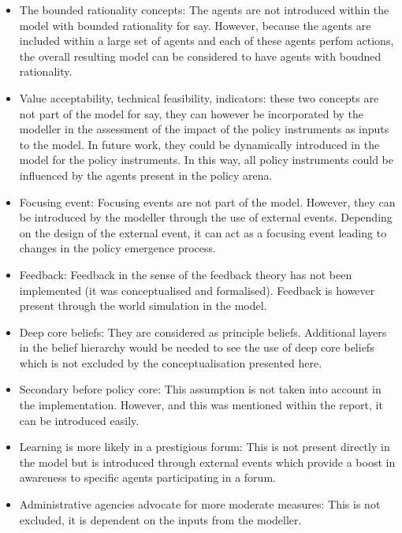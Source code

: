 \begin{itemize}
\item The bounded rationality concepts: The agents are not introduced within the model with bounded rationality for say. However, because the agents are included within a large set of agents and each of these agents perfom actions, the overall resulting model can be considered to have agents with boudned rationality. 
\item Value acceptability, technical feasibility, indicators: these two concepts are not part of the model for say, they can however be incorporated by the modeller in the assessment of the impact of the policy instruments as inputs to the model. In future work, they could be dynamically introduced in the model for the policy instruments. In this way, all policy instruments could be influenced by the agents present in the policy arena.
\item Focusing event: Focusing events are not part of the model. However, they can be introduced by the modeller through the use of external events. Depending on the design of the external event, it can act as a focusing event leading to changes in the policy emergence process.
\item Feedback: Feedback in the sense of the feedback theory has not been implemented (it was conceptualised and formalised). Feedback is however present through the world simulation in the model. 
\item Deep core beliefs: They are considered as principle beliefs. Additional layers in the belief hierarchy would be needed to see the use of deep core beliefs which is not excluded by the conceptualisation presented here.
\item Secondary before policy core: This assumption is not taken into account in the implementation. However, and this was mentioned within the report, it can be introduced easily.
\item Learning is more likely in a prestigious forum: This is not present directly in the model but is introduced through external events which provide a boost in awareness to specific agents participating in a forum.
\item Administrative agencies advocate for more moderate measures: This is not excluded, it is dependent on the inputs from the modeller.
\end{itemize}